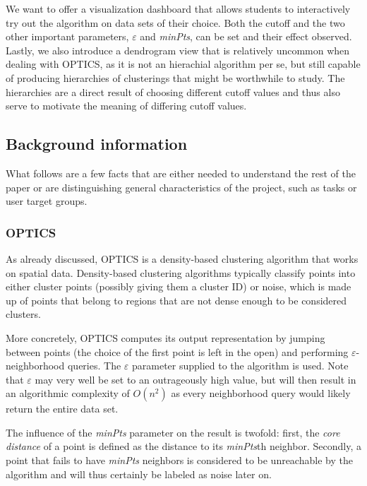 \documentclass{vgtc} %
\begin{document}
We want to offer a visualization dashboard that allows students to
interactively try out the algorithm on data sets of their choice. Both the
cutoff and the two other important parameters, $\varepsilon$ and \emph{minPts}, can
be set and their effect observed. Lastly, we also introduce a dendrogram view
that is relatively uncommon when dealing with OPTICS, as it is not an hierachial
algorithm per se, but still capable of producing hierarchies of clusterings
that might be worthwhile to study. The hierarchies are a direct result of
choosing different cutoff values and thus also serve to motivate the meaning of
differing cutoff values.

\subsection{Background information}

What follows are a few facts that are either needed to understand the rest
of the paper or are distinguishing general characteristics of the project,
such as tasks or user target groups.


\subsubsection{OPTICS}

As already discussed, OPTICS is a density-based clustering algorithm that works
on spatial data. Density-based clustering algorithms typically classify points
into either cluster points (possibly giving them a cluster ID) or noise, which
is made up of points that belong to regions that are not dense enough to be
considered clusters.

More concretely, OPTICS computes its output representation by jumping between
points (the choice of the first point is left in the open) and performing
$\varepsilon$-neighborhood queries. The $\varepsilon$ parameter supplied to the
algorithm is used. Note that $\varepsilon$ may very well be set to an
outrageously high value, but will then result in an algorithmic complexity of
$O(n^2)$ as every neighborhood query would likely return the entire data set.

The influence of the \emph{minPts} parameter on the result is twofold: first,
the \emph{core distance} of a point is defined as the distance to its
\emph{minPts}th neighbor. Secondly, a point that fails to have \emph{minPts}
neighbors is considered to be unreachable by the algorithm and will thus
certainly be labeled as noise later on.
\end{document}
